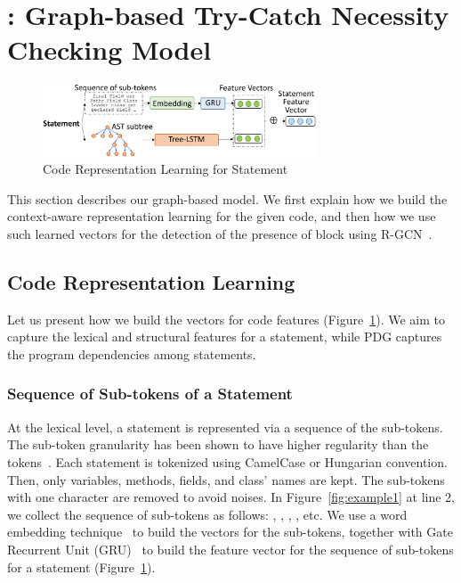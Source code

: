 \section{{\xblock}: Graph-based Try-Catch Necessity Checking Model}
\label{detect:sec}

\begin{figure}[t]
	\centering
	\includegraphics[width=3.2in]{features-2.png}
        \vspace{-0.08in}
	\caption{Code Representation Learning for Statement}
	\label{fig:feature}	
\end{figure}

This section describes our graph-based {\xblock} model. We first
explain how we build the context-aware representation learning for the
given code, and then how we use such learned vectors for the detection
of the presence of  block using R-GCN~\cite{rgcn}.

\subsection{Code Representation Learning}
\label{replearn:sec}

Let us present how we build the vectors for code features
(Figure~\ref{fig:feature}). We aim to capture the lexical and
structural features for a statement, while PDG captures the program
dependencies among statements.

\vspace{-1pt}
\subsubsection{Sequence of Sub-tokens of a Statement}

At the lexical level, a statement is represented via a sequence of the
sub-tokens. The sub-token granularity has been shown to have higher
regularity than the tokens~\cite{icse20-methodname}. Each statement is
tokenized using CamelCase or Hungarian convention. Then, only
variables, methods, fields, and class' names are kept. The sub-tokens
with one character are removed to avoid noises. In
Figure~\ref{fig:example1} at line 2, we collect the sequence of
sub-tokens as follows: , , ,
, etc. We use a word embedding technique~\cite{glove2014}
to build the vectors for the sub-tokens, together with Gate Recurrent
Unit (GRU)~\cite{chung2014empirical} to build the feature vector for
the sequence of sub-tokens for a statement (Figure~\ref{fig:feature}).


